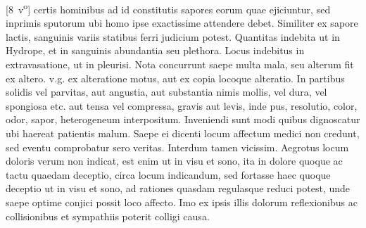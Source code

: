 [8~v\textsuperscript{o}]
certis hominibus ad id constitutis sapores\protect{} eorum quae ejiciuntur, sed inprimis sputorum\protect{} ubi homo\protect{} ipse exactissime attendere debet. Similiter ex sapore\protect{} lactis\protect{}, sanguinis\protect{} variis statibus ferri judicium potest.
\pend%
\pstart%
Quantitas indebita ut in Hydrope\protect{}, et in sanguinis abundantia seu plethora\protect{}. Locus indebitus in extravasatione\protect{}, ut in pleurisi\protect{}. Nota concurrunt saepe multa mala, seu alterum
fit ex altero. v.g. ex alteratione motus, aut ex copia locoque alteratio. In partibus solidis
vel parvitas, aut angustia, aut substantia nimis mollis, vel dura, vel spongiosa etc. aut tensa vel compressa, gravis aut levis, inde pus, resolutio, color\protect{}, odor\protect{}, sapor\protect{}, heterogeneum interpositum. Inveniendi sunt modi quibus dignoscatur ubi haereat patientis malum. Saepe ei dicenti locum affectum medici\protect{} non credunt, sed eventu comprobatur sero veritas. Interdum tamen vicissim. Aegrotus locum doloris\protect{} verum non indicat, est enim ut in visu\protect{} et sono\protect{}, ita in dolore\protect{} quoque ac tactu\protect{} quaedam deceptio, circa locum indicandum, sed fortasse haec quoque deceptio ut in visu\protect{} et sono\protect{}, ad rationes quasdam regulasque reduci potest, unde saepe optime conjici possit
loco affecto. Imo ex ipsis illis dolorum\protect{} reflexionibus ac collisionibus et sympathiis poterit colligi causa. 

